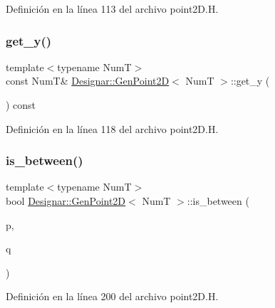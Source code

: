 Definición en la línea 113 del archivo point2\+D.\+H.

\mbox{\label{class_designar_1_1_gen_point2_d_ac8aa7a258e736f715b1e164206316f79}} 
\subsubsection{\texorpdfstring{get\+\_\+y()}{get\_y()}}
{\footnotesize\ttfamily template$<$typename NumT$>$ \\
const NumT\& \hyperlink{class_designar_1_1_gen_point2_d}{Designar\+::\+Gen\+Point2D}$<$ NumT $>$\+::get\+\_\+y (\begin{DoxyParamCaption}{ }\end{DoxyParamCaption}) const\hspace{0.3cm}{\ttfamily [inline]}}



Definición en la línea 118 del archivo point2\+D.\+H.

\mbox{\label{class_designar_1_1_gen_point2_d_ad08c66d5213123e3c3e804d1fbeedee3}} 
\subsubsection{\texorpdfstring{is\+\_\+between()}{is\_between()}}
{\footnotesize\ttfamily template$<$typename NumT$>$ \\
bool \hyperlink{class_designar_1_1_gen_point2_d}{Designar\+::\+Gen\+Point2D}$<$ NumT $>$\+::is\+\_\+between (\begin{DoxyParamCaption}\item[{const \hyperlink{class_designar_1_1_gen_point2_d}{Gen\+Point2D}$<$ NumT $>$ \&}]{p,  }\item[{const \hyperlink{class_designar_1_1_gen_point2_d}{Gen\+Point2D}$<$ NumT $>$ \&}]{q }\end{DoxyParamCaption})\hspace{0.3cm}{\ttfamily [inline]}}



Definición en la línea 200 del archivo point2\+D.\+H.

